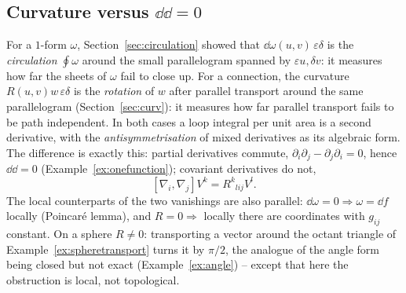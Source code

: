 \subsection{Curvature versus $\dd\dd=0$}\label{sec:curvdd}

\begin{synthesis}
For a $1$-form $\omega$, Section~\ref{sec:circulation} showed that $\dd\omega(u,v)\,\varepsilon\delta$ is the \emph{circulation} $\oint\omega$ around the small parallelogram spanned by $\varepsilon u,\delta v$: it measures how far the sheets of $\omega$ fail to close up.
For a connection, the curvature $R(u,v)w\,\varepsilon\delta$ is the \emph{rotation} of $w$ after parallel transport around the same parallelogram (Section~\ref{sec:curv}): it measures how far parallel transport fails to be path independent.
In both cases a loop integral per unit area is a second derivative, with the \emph{antisymmetrisation} of mixed derivatives as its algebraic form. The difference is exactly this: partial derivatives commute, $\partial_i\partial_j-\partial_j\partial_i=0$, hence $\dd\dd=0$ (Example~\ref{ex:onefunction}); covariant derivatives do not,
\[
[\nabla_i,\nabla_j]V^k=R^k{}_{lij}V^l .
\]
The local counterparts of the two vanishings are also parallel: $\dd\omega=0\Rightarrow\omega=\dd f$ locally (Poincar\'e lemma), and $R=0\Rightarrow$ locally there are coordinates with $g_{ij}$ constant.
On a sphere $R\neq0$: transporting a vector around the octant triangle of Example~\ref{ex:spheretransport} turns it by $\pi/2$, the analogue of the angle form being closed but not exact (Example~\ref{ex:angle}) -- except that here the obstruction is local, not topological.
\end{synthesis}
